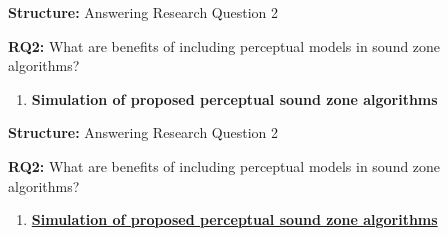 \documentclass[aspectratio=169]{beamer}
\begin{document}
\begin{frame}{\textbf{Structure:} Answering Research Question 2}
    \begin{block}{\textbf{RQ2:} What are benefits of including perceptual models in sound zone algorithms?}
        \begin{enumerate}
            \item \textbf{Simulation of proposed perceptual sound zone algorithms}
                \\\vspace{\baselineskip}\vspace{\baselineskip}\vspace{2.2pt}
                \vspace{3pt}
        \end{enumerate}
    \end{block}
\end{frame}

\begin{frame}{\textbf{Structure:} Answering Research Question 2}
    \begin{block}{\textbf{RQ2:} What are benefits of including perceptual models in sound zone algorithms?}
        \begin{enumerate}
            \item \underline{\textbf{Simulation of proposed perceptual sound zone algorithms}}
                \\\vspace{\baselineskip}\vspace{\baselineskip}
                \vspace{3pt}
        \end{enumerate}
    \end{block}
\end{frame}
\end{document}
